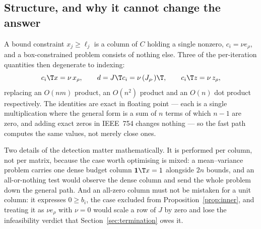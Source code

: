 \subsection{Structure, and why it cannot change the answer}

A bound constraint $x_j \ge \ell_j$ is a column of $C$ holding a single nonzero,
$c_i = \nu e_\rho$, and a box-constrained problem consists of nothing else. Three
of the per-iteration quantities then degenerate to indexing:
\begin{equation}
  c_i\T x = \nu\, x_\rho,
  \qquad
  d = J\T c_i = \nu\, (J_{\rho\cdot})\T,
  \qquad
  c_i\T z = \nu\, z_\rho ,
  \label{eq:unit}
\end{equation}
replacing an $O(nm)$ product, an $O(n^2)$ product and an $O(n)$ dot product
respectively. The identities are exact in floating point --- each is a single
multiplication where the general form is a sum of $n$ terms of which $n-1$ are
zero, and adding exact zeros in IEEE~754 changes nothing --- so the fast path
computes the same values, not merely close ones.

Two details of the detection matter mathematically. It is performed per column,
not per matrix, because the case worth optimising is mixed: a mean--variance
problem carries one dense budget column $\mathbf{1}\T x = 1$ alongside $2n$
bounds, and an all-or-nothing test would observe the dense column and send the
whole problem down the general path. And an all-zero column must not be mistaken
for a unit column: it expresses $0 \ge b_i$, the case excluded from
Proposition~\ref{prop:inner}, and treating it as $\nu e_\rho$ with $\nu = 0$ would
scale a row of $J$ by zero and lose the infeasibility verdict that
Section~\ref{sec:termination} owes it.
